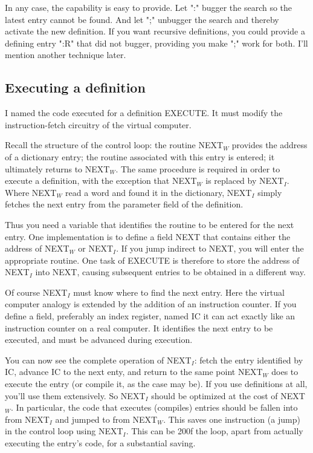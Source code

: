 \documentclass[b5paper, oneside]{book}
\begin{document}
In any case, the capability is easy to provide. Let ":" bugger the search so the latest entry cannot be found. And let ";" unbugger the search and thereby activate the new definition. If you want recursive definitions, you could provide a defining entry ":R" that did not bugger, providing you make ";" work for both. I'll mention another technique later.

\subsection{Executing a definition}
I named the code executed for a definition EXECUTE. It must modify the instruction-fetch circuitry of the virtual computer.

Recall the structure of the control loop: the routine NEXT$_W$ provides the address of a dictionary entry; the routine associated with this entry is entered; it ultimately returns to NEXT$_W$. The same procedure is required in order to execute a definition, with the exception that NEXT$_W$ is replaced by NEXT$_I$. Where NEXT$_W$ read a word and found it in the dictionary, NEXT$_I$ simply fetches the next entry from the parameter field of the definition.

Thus you need a variable that identifies the routine to be entered for the next entry. One implementation is to define a field NEXT that contains either the address of NEXT$_W$ or NEXT$_I$. If you jump indirect to NEXT, you will enter the appropriate routine. One task of EXECUTE is therefore to store the address of NEXT$_I$ into NEXT, causing subsequent entries to be obtained in a different way.

Of course NEXT$_I$ must know where to find the next entry. Here the virtual computer analogy is extended by the addition of an instruction counter. If you define a field, preferably an index register, named IC it can act exactly like an instruction counter on a real computer. It identifies the next entry to be executed, and must be advanced during execution.

You can now see the complete operation of NEXT$_I$: fetch the entry identified by IC, advance IC to the next enty, and return to the same point NEXT$_W$ does to execute the entry (or compile it, as the case may be). If you use definitions at all, you'll use them extensively. So NEXT$_I$ should be optimized at the cost of NEXT$_W$. In particular, the code that executes (compiles) entries should be fallen into from NEXT$_I$ and jumped to from NEXT$_W$. This saves one instruction (a jump) in the control loop using NEXT$_I$. This can be 200f the loop, apart from actually executing the entry's code, for a substantial saving.
\end{document}
